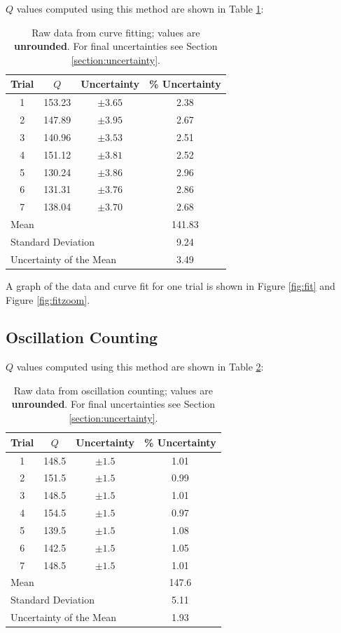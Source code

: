 \documentclass[aps,twocolumn,secnumarabic,nobalancelastpage,amsmath,amssymb,nofootinbib,letterpaper]{revtex4}
\begin{document}
\(Q\) values computed using this method are shown in Table \ref{table:fit}:
\begin{table}[h]
    \begin{tabular}{c|c|c|c}
        Trial & \(Q\) & Uncertainty & \% Uncertainty \\
        \hline
        1   & 153.23    & \(\pm 3.65\) & 2.38 \\
        2   & 147.89    & \(\pm 3.95\) & 2.67 \\
        3	& 140.96	& \(\pm 3.53\) & 2.51 \\
        4	& 151.12	& \(\pm 3.81\) & 2.52 \\
        5	& 130.24	& \(\pm 3.86\) & 2.96 \\
        6	& 131.31	& \(\pm 3.76\) & 2.86 \\
        7	& 138.04	& \(\pm 3.70\) & 2.68 \\
        \hline
        \multicolumn{3}{l}{Mean} & 141.83 \\
        \multicolumn{3}{l}{Standard Deviation} & 9.24 \\
        \multicolumn{3}{l}{Uncertainty of the Mean} & 3.49
    \end{tabular}
    \caption{Raw data from curve fitting; values are \textbf{unrounded}. For final uncertainties see Section
        \ref{section:uncertainty}.}
    \label{table:fit}
\end{table}

A graph of the data and curve fit for one trial is shown in Figure \ref{fig:fit} and Figure \ref{fig:fitzoom}.

\subsection{Oscillation Counting}

\(Q\) values computed using this method are shown in Table \ref{table:oscillation}:
\begin{table}[h]
    \begin{tabular}{c|c|c|c}
        Trial & \(Q\) & Uncertainty & \% Uncertainty \\
        \hline
        1   & 148.5 & \(\pm 1.5\) & 1.01 \\
        2   & 151.5 & \(\pm 1.5\) & 0.99 \\
        3	& 148.5 & \(\pm 1.5\) & 1.01 \\
        4	& 154.5 & \(\pm 1.5\) & 0.97 \\
        5	& 139.5 & \(\pm 1.5\) & 1.08 \\
        6	& 142.5 & \(\pm 1.5\) & 1.05 \\
        7	& 148.5 & \(\pm 1.5\) & 1.01 \\
        \hline
        \multicolumn{3}{l}{Mean} & 147.6 \\
        \multicolumn{3}{l}{Standard Deviation} & 5.11 \\
        \multicolumn{3}{l}{Uncertainty of the Mean} & 1.93
    \end{tabular}
    \caption{Raw data from oscillation counting; values are \textbf{unrounded}. For final uncertainties see Section
        \ref{section:uncertainty}.}
    \label{table:oscillation}
\end{table}
\end{document}
